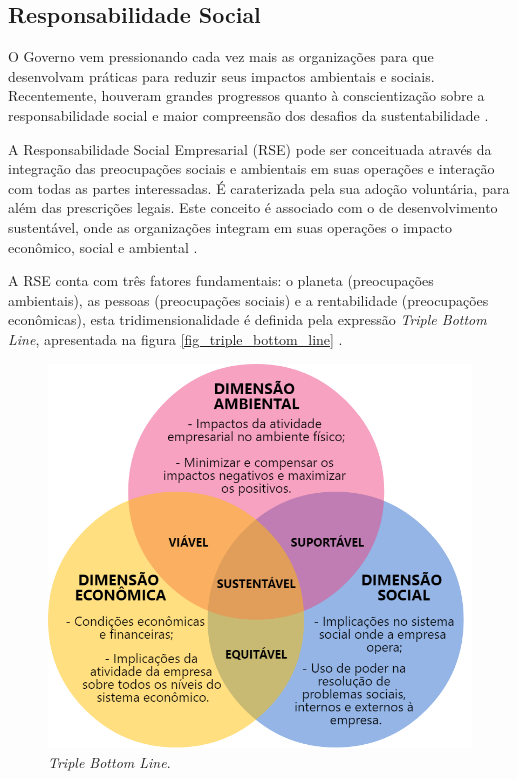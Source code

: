 \subsection{Responsabilidade Social}

O Governo vem pressionando cada vez mais as organizações para que desenvolvam práticas para reduzir seus impactos ambientais e sociais. Recentemente, houveram grandes progressos quanto à conscientização sobre a responsabilidade social e maior compreensão dos desafios da sustentabilidade \cite{kraemer2005responsabilidade}.

A Responsabilidade Social Empresarial (RSE) pode ser conceituada através da integração das preocupações sociais e ambientais em suas operações e interação com todas as partes interessadas. É caraterizada pela sua adoção voluntária, para além das prescrições legais. Este conceito é associado com o de desenvolvimento sustentável, onde as organizações integram em suas operações o impacto econômico, social e ambiental \cite{biorumo}.  

A RSE conta com três fatores fundamentais: o planeta (preocupações ambientais), as pessoas (preocupações sociais) e a rentabilidade (preocupações econômicas), esta tridimensionalidade é definida pela expressão \textit{Triple Bottom Line}, apresentada na figura \autoref{fig_triple_bottom_line} \cite{biorumo}.


\begin{figure}[htb]
    \caption{\label{fig_triple_bottom_line}\textit{Triple Bottom Line}.}
    \begin{center}
        \includegraphics[scale=0.45]{imagens/triple-bottom-line.png}
    \end{center}
\end{figure}

